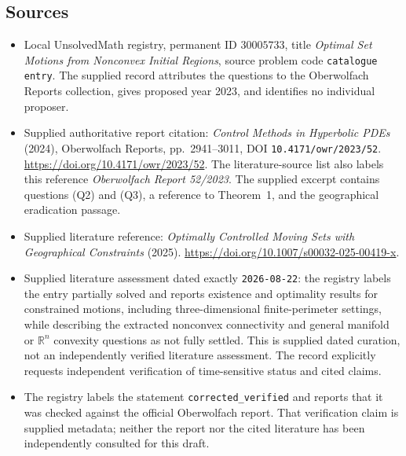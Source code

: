\documentclass[11pt]{article}
\newcommand{\R}{\mathbb{R}}
\begin{document}
\subsection{Sources}
\begin{itemize}
\item Local UnsolvedMath registry, permanent ID \(30005733\), title \emph{Optimal Set Motions from Nonconvex Initial Regions}, source problem code \texttt{catalogue entry}. The supplied record attributes the questions to the Oberwolfach Reports collection, gives proposed year 2023, and identifies no individual proposer.
\item Supplied authoritative report citation: \emph{Control Methods in Hyperbolic PDEs} (2024), Oberwolfach Reports, pp.~2941--3011, DOI \texttt{10.4171/owr/2023/52}. \url{https://doi.org/10.4171/owr/2023/52}. The literature-source list also labels this reference \emph{Oberwolfach Report 52/2023}. The supplied excerpt contains questions (Q2) and (Q3), a reference to Theorem~1, and the geographical eradication passage.
\item Supplied literature reference: \emph{Optimally Controlled Moving Sets with Geographical Constraints} (2025). \url{https://doi.org/10.1007/s00032-025-00419-x}.
\item Supplied literature assessment dated exactly \texttt{2026-08-22}: the registry labels the entry partially solved and reports existence and optimality results for constrained motions, including three-dimensional finite-perimeter settings, while describing the extracted nonconvex connectivity and general manifold or \(\R^n\) convexity questions as not fully settled. This is supplied dated curation, not an independently verified literature assessment. The record explicitly requests independent verification of time-sensitive status and cited claims.
\item The registry labels the statement \texttt{corrected\_verified} and reports that it was checked against the official Oberwolfach report. That verification claim is supplied metadata; neither the report nor the cited literature has been independently consulted for this draft.
\end{itemize}
\end{document}
